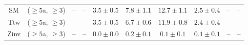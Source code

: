\begin{table}[h!]
{\begin{tabular}{cccccccccc}
	SM & ($\ge5$a, $\ge3$) & -- & -- & $3.5\pm 0.5$ & $7.8\pm 1.1$ & $12.7\pm 1.1$ & $2.5\pm 0.4$ & -- & -- \\[0.5ex] 
	Ttw & ($\ge5$a, $\ge3$) & -- & -- & $3.5\pm 0.5$ & $6.7\pm 0.6$ & $11.9\pm 0.8$ & $2.4\pm 0.4$ & -- & -- \\[0.5ex] 
	Zinv & ($\ge5$a, $\ge3$) & -- & -- & $0.0\pm 0.0$ & $0.2\pm 0.1$ & $0.1\pm 0.1$ & $0.1\pm 0.1$ & -- & -- \\[0.5ex] 
	\hline
	\hline
\end{tabular}}
\end{table}
